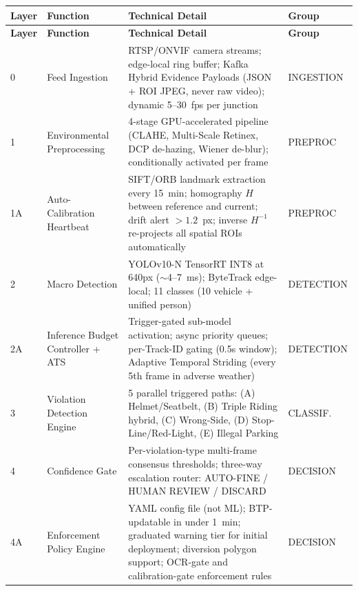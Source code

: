\documentclass[11pt,a4paper]{article}
\begin{document}
\begin{longtable}{C{1.2cm} L{3cm} L{6.8cm} L{2.5cm}}
    \toprule
    \color{white}\textbf{Layer} & \color{white}\textbf{Function} & \color{white}\textbf{Technical Detail} & \color{white}\textbf{Group} \\
    \midrule
    \endfirsthead
    \toprule
    \color{white}\textbf{Layer} & \color{white}\textbf{Function} & \color{white}\textbf{Technical Detail} & \color{white}\textbf{Group} \\
    \midrule
    \endhead
    \bottomrule
    \endfoot

    0 & Feed Ingestion & RTSP/ONVIF camera streams; edge-local ring buffer; Kafka Hybrid Evidence Payloads (JSON + ROI JPEG, never raw video); dynamic 5--30~fps per junction & INGESTION \\
    1 & Environmental Preprocessing & 4-stage GPU-accelerated pipeline (CLAHE, Multi-Scale Retinex, DCP de-hazing, Wiener de-blur); conditionally activated per frame & PREPROC \\
    1A & Auto-Calibration Heartbeat & SIFT/ORB landmark extraction every 15~min; homography $H$ between reference and current; drift alert $> 1.2$~px; inverse $H^{-1}$ re-projects all spatial ROIs automatically & PREPROC \\
    2 & Macro Detection & YOLOv10-N TensorRT INT8 at 640px ($\sim$4--7~ms); ByteTrack edge-local; 11 classes (10 vehicle + unified person) & DETECTION \\
    2A & Inference Budget Controller + ATS & Trigger-gated sub-model activation; async priority queues; per-Track-ID gating (0.5s window); Adaptive Temporal Striding (every 5th frame in adverse weather) & DETECTION \\
    3 & Violation Detection Engine & 5 parallel triggered paths: (A) Helmet/Seatbelt, (B) Triple Riding hybrid, (C) Wrong-Side, (D) Stop-Line/Red-Light, (E) Illegal Parking & CLASSIF. \\
    4 & Confidence Gate & Per-violation-type multi-frame consensus thresholds; three-way escalation router: AUTO-FINE / HUMAN REVIEW / DISCARD & DECISION \\
    4A & Enforcement Policy Engine & YAML config file (not ML); BTP-updatable in under 1~min; graduated warning tier for initial deployment; diversion polygon support; OCR-gate and calibration-gate enforcement rules & DECISION \\

\end{longtable}
\end{document}
